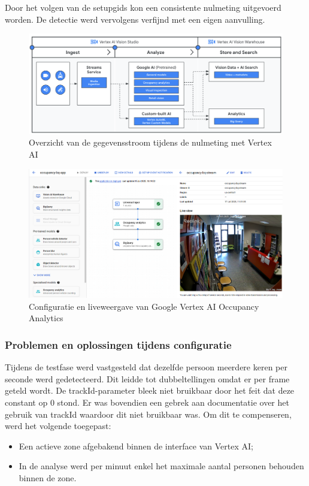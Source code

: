 Door het volgen van de setupgids kon een consistente nulmeting uitgevoerd worden. De detectie werd vervolgens verfijnd met een eigen aanvulling.

\begin{figure}[H] 
    \centering
    \includegraphics[width=\linewidth]{img/bp/vertex/vertex-flowchart.png}
    \caption{Overzicht van de gegevensstroom tijdens de nulmeting met Vertex AI \autocite{Cloud2025}}
    \label{fig:flowchart}
\end{figure}

\begin{figure}[H] 
    \centering
    \includegraphics[width=16cm]{img/bp/vertex/combined_images.png}
    \caption{Configuratie en liveweergave van Google Vertex AI Occupancy Analytics}
    \label{fig:app}
\end{figure}

\subsubsection{Problemen en oplossingen tijdens configuratie}
Tijdens de testfase werd vastgesteld dat dezelfde persoon meerdere keren per seconde werd gedetecteerd. Dit leidde tot dubbeltellingen omdat er per frame geteld wordt. De trackId-parameter bleek niet bruikbaar door het feit dat deze constant op 0 stond. Er was bovendien een gebrek aan documentatie over het gebruik van trackId waardoor dit niet bruikbaar was. Om dit te compenseren, werd het volgende toegepast:
\begin{itemize}
    \item Een actieve zone afgebakend binnen de interface van Vertex AI;
    \item In de analyse werd per minuut enkel het maximale aantal personen behouden binnen de zone.
\end{itemize}    

